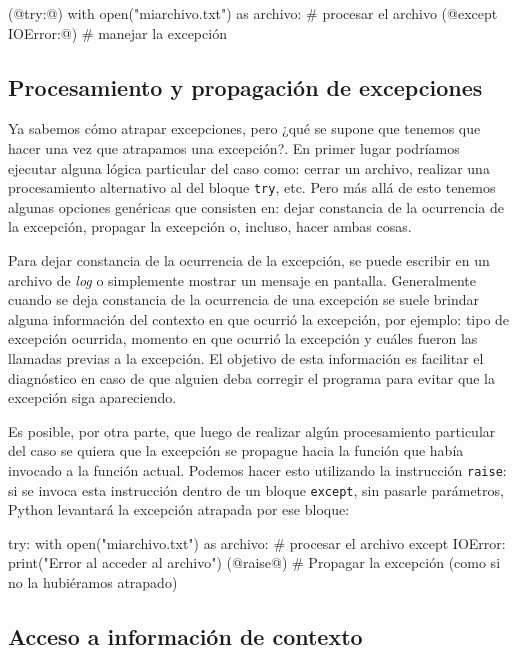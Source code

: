 \begin{codigo-python-sn}
(@try:@)
    with open("miarchivo.txt") as archivo:
        # procesar el archivo
(@except IOError:@)
    # manejar la excepción
\end{codigo-python-sn}

\subsection{Procesamiento y propagación de excepciones}

Ya sabemos cómo atrapar excepciones, pero ¿qué se supone que tenemos que hacer
una vez que atrapamos una excepción?. En primer lugar podríamos
ejecutar alguna lógica particular del caso como: cerrar un archivo,
realizar una procesamiento alternativo al del bloque \lstinline!try!, etc.
Pero más allá de esto tenemos algunas opciones genéricas que consisten en:
dejar constancia de la ocurrencia de la excepción, propagar la excepción o,
incluso, hacer ambas cosas.

Para dejar constancia de la ocurrencia de la excepción, se puede escribir
en un archivo de {\it log} o simplemente mostrar un mensaje en pantalla.
Generalmente cuando se deja constancia de la ocurrencia de una excepción se
suele brindar alguna información del contexto en que ocurrió la excepción,
por ejemplo: tipo de excepción ocurrida, momento en que ocurrió la
excepción y cuáles fueron las llamadas previas a la excepción. El objetivo
de esta información es facilitar el diagnóstico en caso de que alguien deba
corregir el programa para evitar que la excepción siga apareciendo.

Es posible, por otra parte, que luego de realizar algún procesamiento
particular del caso se quiera que la excepción se propague hacia la función
que había invocado a la función actual. Podemos hacer esto utilizando
la instrucción \lstinline!raise!: si se invoca esta instrucción dentro de un
bloque \lstinline!except!, sin pasarle parámetros, Python levantará la
excepción atrapada por ese bloque:

\begin{codigo-python-sn}
try:
    with open("miarchivo.txt") as archivo:
        # procesar el archivo
except IOError:
    print("Error al acceder al archivo")
    (@raise@) # Propagar la excepción (como si no la hubiéramos atrapado)
\end{codigo-python-sn}

\subsection{Acceso a información de contexto}

